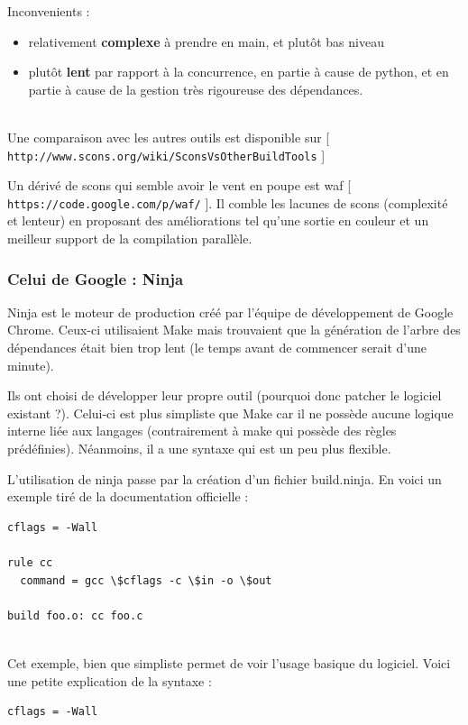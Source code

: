 \documentclass[11pt,twoside,a4paper]{article}
\begin{document}
Inconvenients :
\begin{itemize}
	\item relativement \textbf{complexe} {\`a} prendre en main, et plut{\^o}t bas niveau
	\item plut{\^o}t \textbf{lent} par rapport {\`a} la concurrence, en partie {\`a} cause de python, et en partie {\`a} cause de la gestion tr{\`e}s rigoureuse des d{\'e}pendances.
\end{itemize}~\\

Une comparaison avec les autres outils est disponible sur [ \texttt{http://www.scons.org/wiki/SconsVsOtherBuildTools} ]

Un d{\'e}riv{\'e} de scons qui semble avoir le vent en poupe est waf [ \texttt{https://code.google.com/p/waf/} ]. Il comble les lacunes de scons (complexit{\'e} et lenteur) en proposant des am{\'e}liorations tel qu'une sortie en couleur et un meilleur support de la compilation parall{\`e}le.

\subsubsection{Celui de Google : Ninja}

Ninja est le moteur de production cr{\'e}{\'e} par l'{\'e}quipe de d{\'e}veloppement de Google Chrome. Ceux-ci utilisaient Make mais trouvaient que la g{\'e}n{\'e}ration de l'arbre des d{\'e}pendances {\'e}tait bien trop lent (le temps avant de commencer serait d'une minute).

Ils ont choisi de d{\'e}velopper leur propre outil (pourquoi donc patcher le logiciel existant ?). Celui-ci est plus simpliste que Make car il ne poss{\`e}de aucune logique interne li{\'e}e aux langages (contrairement {\`a} make qui poss{\`e}de des r{\`e}gles pr{\'e}d{\'e}finies). N{\'e}anmoins, il a une syntaxe qui est un peu plus flexible.

L'utilisation de ninja passe par la cr{\'e}ation d'un fichier build.ninja. En voici un exemple tir{\'e} de la documentation officielle :

		\begin{verbatim}
cflags = -Wall

rule cc
  command = gcc \$cflags -c \$in -o \$out

build foo.o: cc foo.c
		\end{verbatim}~\\


Cet exemple, bien que simpliste permet de voir l'usage basique du logiciel. Voici une petite explication de la syntaxe :
		\begin{verbatim}
cflags = -Wall
		\end{verbatim}~\\
\end{document}
